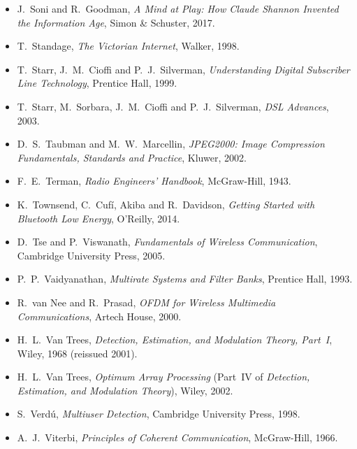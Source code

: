 \begin{itemize}[leftmargin=1.5em,itemindent=-1.5em,itemsep=1.5pt plus 1pt,parsep=0pt,topsep=4pt,label={}]
\item J.~Soni and R.~Goodman, \emph{A Mind at Play: How Claude Shannon Invented the Information Age}, Simon \& Schuster, 2017.
\item T.~Standage, \emph{The Victorian Internet}, Walker, 1998.
\item T.~Starr, J.~M.~Cioffi and P.~J.~Silverman, \emph{Understanding Digital Subscriber Line Technology}, Prentice Hall, 1999.
\item T.~Starr, M.~Sorbara, J.~M.~Cioffi and P.~J.~Silverman, \emph{DSL Advances}, 2003.
\item D.~S.~Taubman and M.~W.~Marcellin, \emph{JPEG2000: Image Compression Fundamentals, Standards and Practice}, Kluwer, 2002.
\item F.~E.~Terman, \emph{Radio Engineers' Handbook}, McGraw-Hill, 1943.
\item K.~Townsend, C.~Cuf\'i, Akiba and R.~Davidson, \emph{Getting Started with Bluetooth Low Energy}, O'Reilly, 2014.
\item D.~Tse and P.~Viswanath, \emph{Fundamentals of Wireless Communication}, Cambridge University Press, 2005.
\item P.~P.~Vaidyanathan, \emph{Multirate Systems and Filter Banks}, Prentice Hall, 1993.
\item R.~van Nee and R.~Prasad, \emph{OFDM for Wireless Multimedia Communications}, Artech House, 2000.
\item H.~L.~Van Trees, \emph{Detection, Estimation, and Modulation Theory, Part~I}, Wiley, 1968 (reissued 2001).
\item H.~L.~Van Trees, \emph{Optimum Array Processing} (Part~IV of \emph{Detection, Estimation, and Modulation Theory}), Wiley, 2002.
\item S.~Verd\'u, \emph{Multiuser Detection}, Cambridge University Press, 1998.
\item A.~J.~Viterbi, \emph{Principles of Coherent Communication}, McGraw-Hill, 1966.

\end{itemize}
